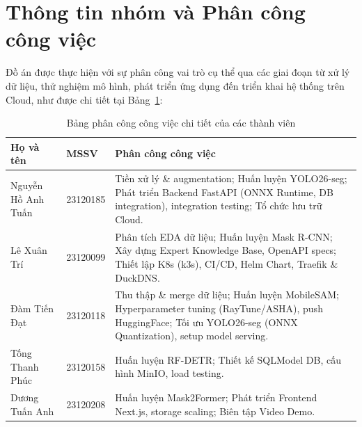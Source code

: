 \section*{Thông tin nhóm và Phân công công việc}

Đồ án được thực hiện với sự phân công vai trò cụ thể qua các giai đoạn từ xử lý dữ liệu, thử nghiệm mô hình, phát triển ứng dụng đến triển khai hệ thống trên Cloud, như được chi tiết tại Bảng~\ref{tab:phan-cong-cong-viec}:

\begin{table}[htbp]
\centering
\caption{Bảng phân công công việc chi tiết của các thành viên}
\label{tab:phan-cong-cong-viec}
\begin{tabularx}{\textwidth}{l l X}
\toprule
\textbf{Họ và tên} & \textbf{MSSV} & \textbf{Phân công công việc} \\ \midrule
Nguyễn Hồ Anh Tuấn & 23120185 & Tiền xử lý \& augmentation; Huấn luyện YOLO26-seg; Phát triển Backend FastAPI (ONNX Runtime, DB integration), integration testing; Tổ chức lưu trữ Cloud. \\
Lê Xuân Trí & 23120099 & Phân tích EDA dữ liệu; Huấn luyện Mask R-CNN; Xây dựng Expert Knowledge Base, OpenAPI specs; Thiết lập K8s (k3s), CI/CD, Helm Chart, Traefik \& DuckDNS. \\
Đàm Tiến Đạt & 23120118 & Thu thập \& merge dữ liệu; Huấn luyện MobileSAM; Hyperparameter tuning (RayTune/ASHA), push HuggingFace; Tối ưu YOLO26-seg (ONNX Quantization), setup model serving. \\
Tống Thanh Phúc & 23120158 & Huấn luyện RF-DETR; Thiết kế SQLModel DB, cấu hình MinIO, load testing. \\
Dương Tuấn Anh & 23120208 & Huấn luyện Mask2Former; Phát triển Frontend Next.js, storage scaling; Biên tập Video Demo. \\ \bottomrule
\end{tabularx}
\end{table}

